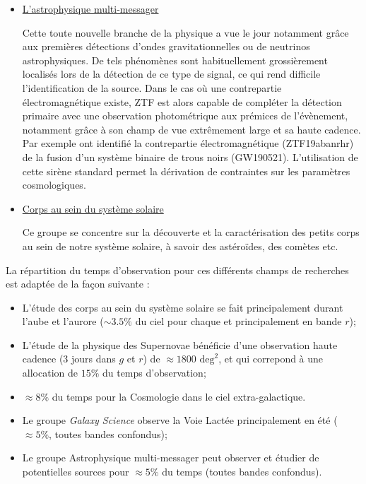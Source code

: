 \documentclass[../main/main.tex]{subfiles}
\begin{document}
\begin{itemize}[label=$\bullet$]
    \item \underline{L'astrophysique multi-messager}

      Cette toute nouvelle branche de la physique a vue le jour notamment grâce aux
      premières détections d'ondes gravitationnelles ou de neutrinos astrophysiques. De
      tels phénomènes sont habituellement grossièrement localisés lors de
      la détection de ce type de signal, ce qui rend difficile
      l'identification de la source. Dans le cas où une contrepartie
      électromagnétique existe, ZTF est alors capable de compléter la
      détection primaire avec une observation photométrique aux prémices de
      l'évènement, notamment grâce à son champ de vue extrêmement
      large et sa haute cadence. Par exemple \citet{Chen2022}
      ont identifié la contrepartie électromagnétique (ZTF19abanrhr) de
      la fusion
      d'un système binaire de trous noirs (GW190521). L'utilisation de cette sirène
      standard permet la dérivation de contraintes sur les paramètres cosmologiques.

    \item \underline{Corps au sein du système solaire}

      Ce groupe se concentre sur la découverte et la caractérisation des
      petits corps au sein de notre système solaire, à savoir des
      astéroïdes, des comètes etc.
\end{itemize}

La répartition du temps d'observation pour ces différents champs de
recherches est adaptée de la façon suivante \citep{Bellm19b}:

\begin{itemize}[label=$\diamondsuit$]
  \itemsep0em 
\item L'étude des corps au sein
  du système solaire se fait principalement durant l'aube et l'aurore
  ($\sim3.5\%$ du ciel pour chaque et principalement en bande $r$);
\item L'étude de la physique des Supernovae bénéficie d'une observation
  haute cadence (3 jours dans $g$ et $r$) de $\approx1800\text{ deg}^{2}$, et qui correpond à une
  allocation de $15\%$ du temps d'observation;
\item  $\approx8\%$ du temps pour la Cosmologie dans le ciel extra-galactique.
\item Le groupe \textit{Galaxy Science} observe la Voie Lactée principalement en
  été ($\approx5\%$, toutes bandes confondus);
\item Le groupe Astrophysique multi-messager peut observer et étudier de
  potentielles sources pour $\approx5\%$ du temps (toutes bandes confondus).
\end{itemize}
\end{document}

